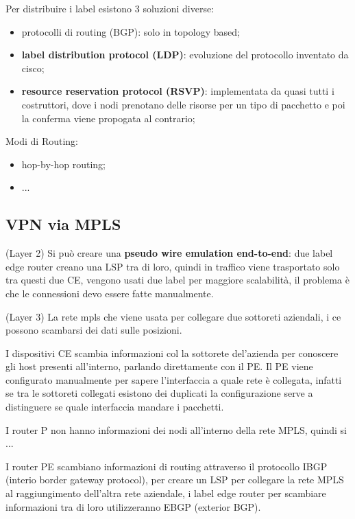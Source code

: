 \documentclass[12pt]{article}
\begin{document}
Per distribuire i label esistono 3 soluzioni diverse:
\begin{itemize}
    \item protocolli di routing (BGP): solo in topology based;
    \item \textbf{label distribution protocol (LDP)}: evoluzione del protocollo inventato da cisco;
    \item \textbf{resource reservation protocol (RSVP)}: implementata da quasi tutti i costruttori, dove i nodi prenotano delle risorse per un tipo di pacchetto e poi la conferma viene propogata al contrario;
\end{itemize}


Modi di Routing:
\begin{itemize}
    \item hop-by-hop routing;
    \item ...
\end{itemize}




\subsection{VPN via MPLS}
(Layer 2)
Si pu\`o creare una \textbf{pseudo wire emulation end-to-end}: due label edge router creano una LSP tra di loro, quindi in traffico viene trasportato solo tra questi due CE, vengono usati due label per maggiore scalabilit\`a, il problema \`e che le connessioni devo essere fatte manualmente.

(Layer 3)
La rete mpls che viene usata per collegare due sottoreti aziendali, i ce possono scambarsi dei dati sulle posizioni.


I dispositivi CE scambia informazioni col la sottorete del'azienda per conoscere gli host presenti all'interno, parlando direttamente con il PE. Il PE viene configurato manualmente per sapere l'interfaccia a quale rete \`e collegata, infatti se tra le sottoreti collegati esistono dei duplicati la configurazione serve a distinguere se quale interfaccia mandare i pacchetti.

I router P non hanno informazioni dei nodi all'interno della rete MPLS, quindi si ...

I router PE scambiano informazioni di routing attraverso il protocollo IBGP (interio border gateway protocol), per creare un LSP per collegare la rete MPLS al raggiungimento dell'altra rete aziendale, i label edge router per scambiare informazioni tra di loro utilizzeranno EBGP (exterior BGP).
\end{document}
